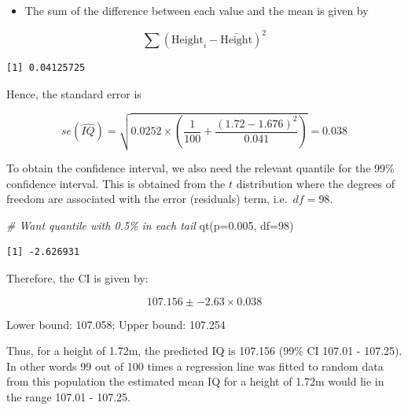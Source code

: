 \documentclass[
  oneside]{krantz}
\newenvironment{Shaded}{\begin{snugshade}}{\end{snugshade}}
\newcommand{\AttributeTok}[1]{\textcolor[rgb]{0.77,0.63,0.00}{#1}}
\newcommand{\CommentTok}[1]{\textcolor[rgb]{0.56,0.35,0.01}{\textit{#1}}}
\newcommand{\DecValTok}[1]{\textcolor[rgb]{0.00,0.00,0.81}{#1}}
\newcommand{\FloatTok}[1]{\textcolor[rgb]{0.00,0.00,0.81}{#1}}
\newcommand{\FunctionTok}[1]{\textcolor[rgb]{0.00,0.00,0.00}{#1}}
\newcommand{\NormalTok}[1]{#1}
\newcommand{\SpecialCharTok}[1]{\textcolor[rgb]{0.00,0.00,0.00}{#1}}
\providecommand{\tightlist}{%
  \setlength{\itemsep}{0pt}\setlength{\parskip}{0pt}}
\begin{document}
\begin{itemize}
\tightlist
\item
  The sum of the difference between each value and the mean is given by
\end{itemize}

\[\sum{(\mathrm{Height}_i-\bar{\mathrm{Height}})^2} \]

\begin{Shaded}
\end{Shaded}

\begin{verbatim}
[1] 0.04125725
\end{verbatim}

Hence, the standard error is

\[se(\hat{IQ})=\sqrt{0.0252\times (\frac{1}{100}+\frac{(1.72-1.676)^2}{0.041})} =0.038\]

To obtain the confidence interval, we also need the relevant quantile for the 99\% confidence interval. This is obtained from the \(t\) distribution where the degrees of freedom are associated with the error (residuals) term, i.e.~\(df=98\).

\begin{Shaded}
\begin{Highlighting}[]
\CommentTok{\# Want quantile with 0.5\% in each tail}
\FunctionTok{qt}\NormalTok{(}\AttributeTok{p=}\FloatTok{0.005}\NormalTok{, }\AttributeTok{df=}\DecValTok{98}\NormalTok{)}
\end{Highlighting}
\end{Shaded}

\begin{verbatim}
[1] -2.626931
\end{verbatim}

Therefore, the CI is given by:

\[107.156 \pm -2.63\times 0.038\]

Lower bound: 107.058; Upper bound: 107.254

Thus, for a height of 1.72m, the predicted IQ is 107.156 (99\% CI 107.01 - 107.25). In other words 99 out of 100 times a regression line was fitted to random data from this population the estimated mean IQ for a height of 1.72m would lie in the range 107.01 - 107.25.
\end{document}
